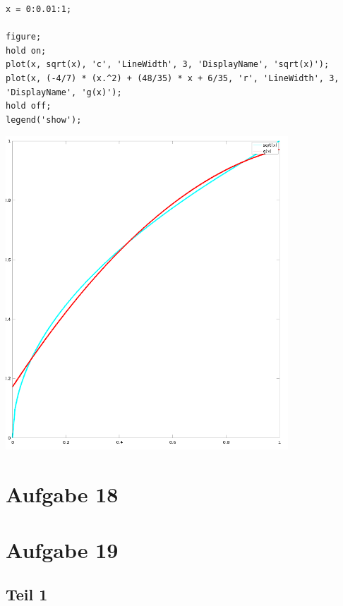 \documentclass[10pt,a4paper]{article}
\begin{document}
\begin{lstlisting}
x = 0:0.01:1;

figure;
hold on;
plot(x, sqrt(x), 'c', 'LineWidth', 3, 'DisplayName', 'sqrt(x)');
plot(x, (-4/7) * (x.^2) + (48/35) * x + 6/35, 'r', 'LineWidth', 3, 'DisplayName', 'g(x)');
hold off;
legend('show');
\end{lstlisting}

\includegraphics[width=300pt]{6_17_p2.png}

\section{Aufgabe 18}

\section{Aufgabe 19}

\subsection{Teil 1}
\end{document}
